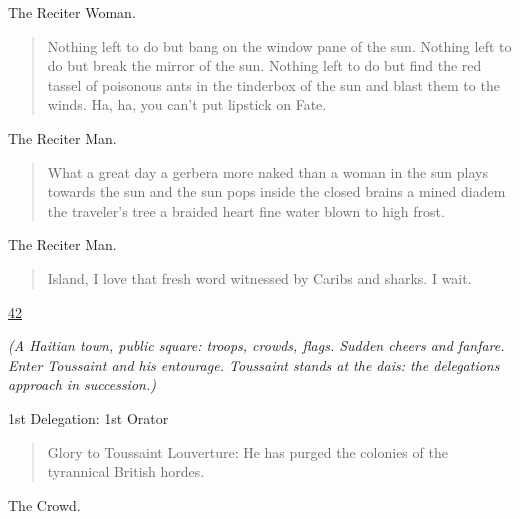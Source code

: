 \documentclass[letterpaper,article,12pt,oneside,notitlepage]{memoir}
\begin{document}
\begin{center}The Reciter Woman.\end{center}

\begin{verse}
Nothing left to do but bang on the window pane of the sun. Nothing left to do but break the mirror of the sun. Nothing left to do but find the red tassel of poisonous ants in the tinderbox of the sun and blast them to the winds. Ha, ha, you can't put lipstick on Fate. \\
\end{verse}

\begin{center}The Reciter Man.\end{center}

\begin{verse}
What a great day a gerbera more naked than a woman in the sun plays towards the sun and the sun pops inside the closed brains a mined diadem the traveler's tree a braided heart fine water blown to high frost. \\
\end{verse}

\begin{center}The Reciter Man.\end{center}

\begin{verse}
Island, I love that fresh word witnessed by Caribs and sharks. I wait. \\
\end{verse}

\clearpage

\href{http://cesaire.elotroalex.com/chiens/chiens/p042.html}{42}

\textit{(A Haitian town, public square: troops, crowds, flags. Sudden cheers and fanfare. Enter Toussaint and his entourage. Toussaint stands at the dais: the delegations approach in succession.)}

\begin{center}1st Delegation: 1st Orator\end{center}

\begin{verse}
\indent Glory to Toussaint Louverture: He has purged the colonies of the tyrannical British hordes. \\
\end{verse}

\begin{center}The Crowd.\end{center}
\end{document}

